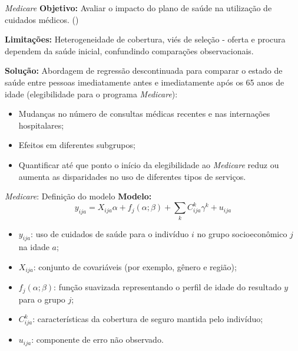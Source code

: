 \documentclass[aspectratio=1610, 10pt]{beamer}
\begin{document}
\begin{frame}{\textit{Medicare}}
        \justifying
        \textbf{Objetivo:} Avaliar o impacto do plano de saúde na utilização de cuidados médicos. (\cite{card2008impact})
        \vspace{0.3cm}

        \textbf{Limitações:} Heterogeneidade de cobertura, viés de seleção - oferta e procura dependem da saúde inicial, confundindo comparações observacionais.
        \vspace{0.3cm}

        \textbf{Solução:} Abordagem de regressão descontinuada para comparar o estado de saúde entre pessoas imediatamente antes e imediatamente após os 65 anos de idade (elegibilidade para o programa \textit{Medicare}):
        \begin{itemize}
            \item Mudanças no número de consultas médicas recentes e nas internações hospitalares;
            \item Efeitos em diferentes subgrupos;
            \item Quantificar até que ponto o início da elegibilidade ao \textit{Medicare} reduz ou aumenta as disparidades no uso de diferentes tipos de serviços.
        \end{itemize}
\end{frame}


\begin{frame}{\textit{Medicare}: Definição do modelo}
    \textbf{Modelo:}
    \begin{equation*}
        y_{ija} = X_{ija}\alpha + f_j(\alpha; \beta) + \sum_k C_{ija}^k \gamma^k + u_{ija}
    \label{model}
    \end{equation*}
    \begin{itemize}
        \item $y_{ija}$: uso de cuidados de saúde para o indivíduo $i$ no grupo socioeconômico $j$ na idade $a$;
        \item $X_{ija}$: conjunto de covariáveis (por exemplo, gênero e região);
        \item $f_j(\alpha; \beta)$: função suavizada representando o perfil de idade do resultado $y$ para o grupo $j$;
        \item $C_{ija}^k$: características da cobertura de seguro mantida pelo indivíduo;
        \item $u_{ija}$: componente de erro não observado.
    \end{itemize}
\end{frame}
\end{document}
